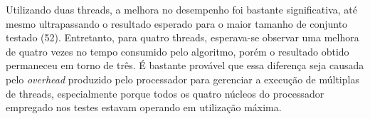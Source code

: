 \documentclass[12pt]{article}
\begin{document}
Utilizando duas threads, a melhora no desempenho foi bastante significativa, até mesmo ultrapassando o resultado esperado para o maior tamanho de conjunto testado (52). Entretanto, para quatro threads, esperava-se observar uma melhora de quatro vezes no tempo consumido pelo algoritmo, porém o resultado obtido permaneceu em torno de três. É bastante provável que essa diferença seja causada pelo \textit{overhead} produzido pelo processador para gerenciar a execução de múltiplas de threads, especialmente porque todos os quatro núcleos do processador empregado nos testes estavam operando em utilização máxima.



\end{document}

